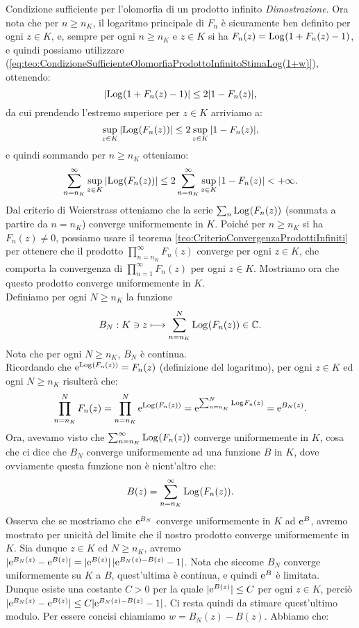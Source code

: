 \documentclass[11pt]{book}
\makeatletter
\theoremstyle{Definizione}
\theoremstyle{TeoremaProposizioneLemmaCorollarioCongettura}
\theoremstyle{OsservazioneNotaEsempio}
\renewenvironment{proof}[1][\proofname]{\par
  \normalfont \topsep6\p@\@plus6\p@\relax
  \trivlist
  \item[\hskip\labelsep
        \itshape
    #1\@addpunct{.}]\ignorespaces
}{%
  \endtrivlist\@endpefalse
}
\renewenvironment{proof}{\textsl{Dimostrazione}.}{}
\newcommand{\C}{\mathbb{C}}
\newcommand{\e}{\textup{e}}
\newcommand{\Log}[1][]{\textup{Log}_{#1}}
\makeatother
\begin{document}
\begin{boxteo}{Condizione sufficiente per l'olomorfia di un prodotto infinito}
\begin{proof}
Ora nota che per $n\geq n_K$, il logaritmo principale di $F_n$ è sicuramente ben definito per ogni $z\in K$, e, sempre per ogni $n\geq n_K$ e $z\in K$ si ha $F_n(z) = \Log(1+F_n(z)-1)$, e quindi possiamo utilizzare (\ref{eq:teo:CondizioneSufficienteOlomorfiaProdottoInfinitoStimaLog(1+w)}), ottenendo:
$$
|\Log(1+F_n(z)-1)| \leq 2|1-F_n(z)|,
$$
da cui prendendo l'estremo superiore per $z\in K$ arriviamo a:
$$
\sup_{z\in K} |\Log(F_n(z))| \leq 2\sup_{z\in K} |1-F_n(z)|,
$$
e quindi sommando per $n\geq n_K$ otteniamo:
$$
\sum_{n = n_K}^\infty \sup_{z\in K} |\Log(F_n(z))| \leq 2\sum_{n = n_K}^\infty\sup_{z\in K} |1-F_n(z)| < +\infty.
$$
Dal criterio di Weierstrass otteniamo che la serie $\sum_{n} \Log(F_n(z))$ (sommata a partire da $n = n_K$) converge uniformemente in $K$. Poiché per $n\geq n_K$ si ha $F_n(z) \neq 0$, possiamo usare il teorema \ref{teo:CriterioConvergenzaProdottiInfiniti} per ottenere che il prodotto $\prod_{n = n_K}^\infty F_n(z)$ converge per ogni $z\in K$, che comporta la convergenza di $\prod_{n = 1}^\infty F_n(z)$ per ogni $z\in K$. Mostriamo ora che questo prodotto converge uniformemente in $K$.\\
Definiamo per ogni $N\geq n_K$ la funzione
$$
B_N:K\ni z \longmapsto \sum_{n = n_K}^N \Log(F_n(z))\in \C.
$$
Nota che per ogni $N \geq n_K$, $B_N$ è continua.\\
Ricordando che $\e^{\Log(F_n(z))} = F_n(z)$ (definizione del logaritmo), per ogni $z\in K$ ed ogni $N\geq n_K$ risulterà che:
$$
\prod_{n = n_K}^N F_n(z) = \prod_{n = n_K}^N \e^{\Log(F_n(z))} = \e^{\sum_{n = n_K}^N \Log F_n(z)} = \e^{B_N(z)}.
$$
Ora, avevamo visto che $\sum_{n = n_K}^\infty \Log(F_n(z))$ converge uniformemente in $K$, cosa che ci dice che $B_N$ converge uniformemente ad una funzione $B$ in $K$, dove ovviamente questa funzione non è nient'altro che:
$$
B(z) = \sum_{n = n_K}^\infty \Log(F_n(z)).
$$
Osserva che se mostriamo che $\e^{B_N}$ converge uniformemente in $K$ ad $\e^{B}$, avremo mostrato per unicità del limite che il nostro prodotto converge uniformemente in $K$. Sia dunque $z\in K$ ed $N \geq n_K$, avremo $|\e^{B_N(z)}-\e^{B(z)}| = |\e^{B(z)}|\, |\e^{B_N(z)-B(z)}-1|$. Nota che siccome $B_N$ converge uniformemente su $K$ a $B$, quest'ultima è continua, e quindi $\e^{B}$ è limitata. Dunque esiste una costante $C > 0$ per la quale $|\e^{B(z)}|\leq C$ per ogni $z\in K$, perciò $|\e^{B_N(z)}-\e^{B(z)}| \leq C |\e^{B_N(z)-B(z)}-1|$. Ci resta quindi da stimare quest'ultimo modulo. Per essere concisi chiamiamo $w = B_N(z)-B(z)$. Abbiamo che:
\begin{align*}

\end{align*}
\end{proof}
\end{boxteo}
\end{document}
